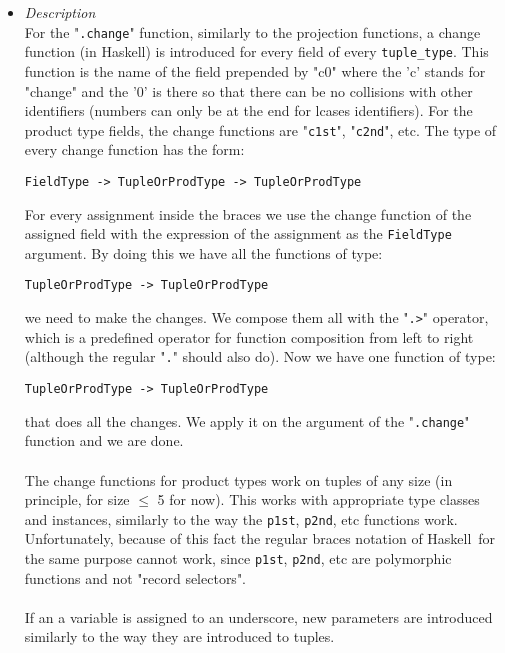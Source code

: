 \documentclass{article}
\def\H{Haskell}
\begin{document}
\begin{itemize}
\begin{itemize}
\item
\textit{Description}\\

For the "\texttt{.change}" function, similarly to the projection functions, a
change function (in \H) is introduced for every field of every
\verb|tuple_type|. This function is the name of the field prepended by "c0"
where the 'c' stands for "change" and the '0' is there so that there can be no
collisions with other identifiers (numbers can only be at the end for lcases
identifiers). For the product type fields, the change functions are
"\texttt{c1st}", "\texttt{c2nd}", etc. The type of every change function
has the form:
\begin{verbatim}
FieldType -> TupleOrProdType -> TupleOrProdType
\end{verbatim}

For every assignment inside the braces we use the change function of the
assigned field with the expression of the assignment as the
\texttt{FieldType} argument. By doing this we have all the functions
of type:
\begin{verbatim}
TupleOrProdType -> TupleOrProdType
\end{verbatim}

we need to make the changes. We compose them all with the "\texttt{.>}"
operator, which is a predefined operator for function composition from left to
right (although the regular "\texttt{.}" should also do). Now we have one
function of type:
\begin{verbatim}
TupleOrProdType -> TupleOrProdType
\end{verbatim}

that does all the changes. We apply it on the argument of the
"\texttt{.change}" function and we are done.
\\\\
The change functions for product types work on tuples of any size
(in principle, for size $\leq$ 5 for now). This works with appropriate type
classes and instances, similarly to the way the \texttt{p1st}, \texttt{p2nd},
etc functions work. Unfortunately, because of this fact the regular braces
notation of \H\ for the same purpose cannot work, since \texttt{p1st},
\texttt{p2nd}, etc are polymorphic functions and not "record selectors".
\\\\
If an a variable is assigned to an underscore, new parameters are introduced
similarly to the way they are introduced to tuples.

\end{itemize}

\end{itemize}
\end{document}
